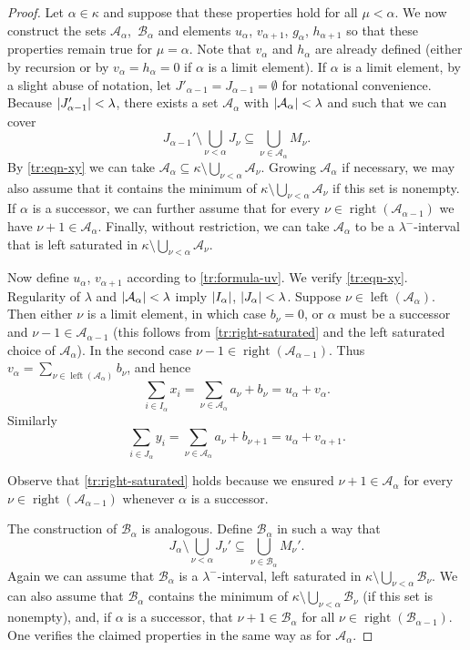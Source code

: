 \documentclass[a4paper,11pt,oneside]{amsart}
\theoremstyle{remark}
\DeclarePairedDelimiter{\card}{\lvert}{\rvert}
\newcommand{\cA}{\mathcal A}
\newcommand{\cB}{\mathcal B}
\DeclareMathOperator{\rep}{right}
\DeclareMathOperator{\lep}{left}
\begin{document}
\begin{proof}
    Let $\alpha \in \kappa$ and suppose that these properties hold for all $\mu < \alpha$.
    We now construct the sets $\cA_\alpha$,~$\cB_\alpha$ and elements $u_\alpha$, $v_{\alpha+1}$, $g_\alpha$, $h_{\alpha+1}$ so that these properties remain true for $\mu=\alpha$.
    Note that $v_\alpha$ and $h_\alpha$ are already defined (either by recursion or by $v_\alpha=h_\alpha=0$ if $\alpha$ is a limit element).
    If $\alpha$ is a limit element, by a slight abuse of notation, let $J'_{\alpha-1}=J_{\alpha-1}=\emptyset$ for notational convenience.
    Because $\card{J_{\alpha-1}'} < \lambda$, there exists a set $\cA_\alpha$ with $\card{\cA_\alpha} < \lambda$ and such that we can cover
    \[
      J_{\alpha-1}' \setminus \bigcup_{\nu < \alpha} J_\nu \subseteq \bigcup_{\nu \in \cA_\alpha} M_{\nu}.
    \]
    By \ref{tr:eqn-xy} we can take $\cA_\alpha \subseteq \kappa \setminus \bigcup_{\nu < \alpha} \cA_\nu$.
    Growing $\cA_\alpha$ if necessary, we may also assume that it contains the minimum of $\kappa \setminus \bigcup_{\nu < \alpha} \cA_\nu$ if this set is nonempty.
    If $\alpha$ is a successor, we can further assume that for every $\nu \in \rep(\cA_{\alpha-1})$ we have $\nu+1 \in \cA_\alpha$.
    Finally, without restriction, we can take $\cA_\alpha$ to be a $\lambda^-$-interval that is left saturated in $\kappa \setminus \bigcup_{\nu < \alpha} \cA_\nu$.

    Now define $u_\alpha$, $v_{\alpha+1}$ according to \ref{tr:formula-uv}.
    We verify \ref{tr:eqn-xy}.
    Regularity of $\lambda$ and $\card{\cA_\alpha} < \lambda$ imply $\card{I_\alpha}$, $\card{J_\alpha} < \lambda$.
    Suppose $\nu \in \lep(\cA_\alpha)$.
    Then either $\nu$ is a limit element, in which case $b_\nu = 0$, or $\alpha$ must be a successor and $\nu-1 \in \cA_{\alpha-1}$ (this follows from \ref{tr:right-saturated} and the left saturated choice of $\cA_\alpha$).
    In the second case $\nu-1 \in \rep(\cA_{\alpha-1})$.
    Thus $v_\alpha = \sum_{\nu \in \lep(\cA_\alpha)} b_\nu$, and hence
    \[
      \sum_{i \in I_\alpha} x_i = \sum_{\nu \in \cA_\alpha} a_\nu + b_\nu = u_\alpha + v_\alpha.
    \]
    Similarly
    \[
      \sum_{i \in J_\alpha} y_i = \sum_{\nu \in \cA_\alpha} a_\nu + b_{\nu+1} = u_\alpha + v_{\alpha+1}.
    \]
    
    Observe that \ref{tr:right-saturated} holds because we ensured $\nu + 1 \in \cA_\alpha$ for every $\nu \in \rep(\cA_{\alpha-1})$ whenever $\alpha$ is a successor.

    The construction of $\cB_\alpha$ is analogous.
    Define $\cB_\alpha$ in such a way that
    \[
      J_\alpha \setminus \bigcup_{\nu < \alpha} J_\nu' \subseteq \bigcup_{\nu \in \cB_\alpha} M_\nu'.
    \]
    Again we can assume that $\cB_\alpha$ is a $\lambda^-$-interval, left saturated in $\kappa \setminus \bigcup_{\nu < \alpha} \cB_\nu$.
    We can also assume that $\cB_\alpha$ contains the minimum of $\kappa \setminus \bigcup_{\nu < \alpha} \cB_\nu$ (if this set is nonempty), and, if $\alpha$ is a successor, that $\nu + 1 \in \cB_{\alpha}$ for all $\nu \in \rep(\cB_{\alpha-1})$.
    One verifies the claimed properties in the same way as for $\cA_\alpha$.


\end{proof}
\end{document}
